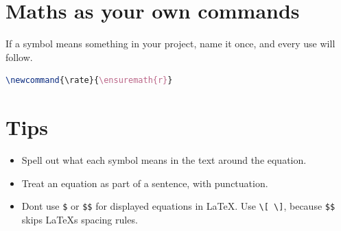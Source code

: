 \section{Maths as your own commands}\label{maths-as-your-own-commands}

If a symbol means something in your project, name it once, and every use will follow.

\begin{lstlisting}[language=latex]
\newcommand{\rate}{\ensuremath{r}}
\end{lstlisting}

\section{Tips}\label{tips}

\begin{itemize}
\tightlist
\item
  Spell out what each symbol means in the text around the equation.
\item
  Treat an equation as part of a sentence, with punctuation.
\item
  Don\textquotesingle t use \texttt{\$} or \texttt{\$\$} for displayed equations in LaTeX. Use \texttt{\textbackslash{}{[}\ \textbackslash{}{]}}, because \texttt{\$\$} skips LaTeX\textquotesingle s spacing rules.
\end{itemize}

